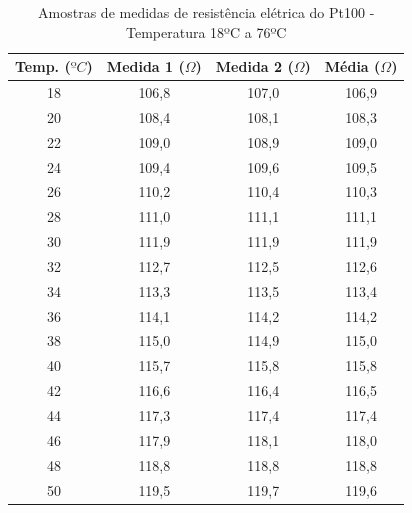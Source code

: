 \documentclass[a4paper]{instrumentacao}
\begin{document}
\begin{table}[]
\centering
\caption{Amostras de medidas de resistência elétrica do Pt100 - Temperatura 18ºC a 76ºC}
\label{tab:amostras-pt100}
\begin{tabular}{|c|c|c|c|}
\hline
\textbf{Temp. ($ºC$)} & \textbf{Medida 1 ($\Omega$)} & \textbf{Medida 2 ($\Omega$)} & \textbf{Média ($\Omega$)} \\ \hline
18                  & 106,8                 & 107,0                 & 106,9          \\ \hline
20                  & 108,4                 & 108,1                 & 108,3          \\ \hline
22                  & 109,0                 & 108,9                 & 109,0          \\ \hline
24                  & 109,4                 & 109,6                 & 109,5          \\ \hline
26                  & 110,2                 & 110,4                 & 110,3          \\ \hline
28                  & 111,0                 & 111,1                 & 111,1          \\ \hline
30                  & 111,9                 & 111,9                 & 111,9          \\ \hline
32                  & 112,7                 & 112,5                 & 112,6          \\ \hline
34                  & 113,3                 & 113,5                 & 113,4          \\ \hline
36                  & 114,1                 & 114,2                 & 114,2          \\ \hline
38                  & 115,0                 & 114,9                 & 115,0          \\ \hline
40                  & 115,7                 & 115,8                 & 115,8          \\ \hline
42                  & 116,6                 & 116,4                 & 116,5          \\ \hline
44                  & 117,3                 & 117,4                 & 117,4          \\ \hline
46                  & 117,9                 & 118,1                 & 118,0          \\ \hline
48                  & 118,8                 & 118,8                 & 118,8          \\ \hline
50                  & 119,5                 & 119,7                 & 119,6          \\ \hline

\end{tabular}
\end{table}
\end{document}
